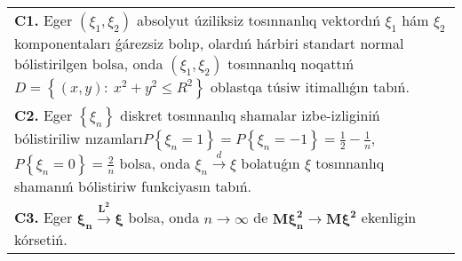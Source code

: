 \documentclass{article}
\begin{document}
\begin{tabular}{m{17cm}}
\textbf{C1.} Eger \(\left( \xi_{1},\xi_{2} \right)\) absolyut úziliksiz tosınnanlıq vektordıń \(\xi_{1}\) hám \(\xi_{2}\) komponentaları ǵárezsiz bolıp, olardıń hárbiri standart normal bólistirilgen bolsa, onda \(\left( \xi_{1},\xi_{2} \right)\) tosınnanlıq noqattıń \(D = \left\{ (x,y):\ x^{2} + y^{2} \leq R^{2} \right\}\) oblastqa túsiw itimallıǵın tabıń.
 \\
\textbf{C2.} Eger \(\left\{ \xi_{n} \right\}\) diskret tosınnanlıq shamalar izbe-izliginiń bólistiriliw nızamları\(P\left\{ \xi_{n} = 1 \right\} = P\left\{ \xi_{n} = - 1 \right\} = \frac{1}{2} - \frac{1}{n},\) \(P\left\{ \xi_{n} = 0 \right\} = \frac{2}{n}\) bolsa, onda \(\xi_{n}\overset{d}{\rightarrow}\xi\) bolatuǵın \(\xi\) tosınnanlıq shamanıń bólistiriw funkciyasın tabıń.
 \\
\textbf{C3.} Eger \(\mathbf{\xi}_{\mathbf{n}}\overset{\mathbf{L}^{\mathbf{2}}}{\rightarrow}\mathbf{\xi}\) bolsa, onda \(n \rightarrow \infty\) de \(\mathbf{M}\mathbf{\xi}_{\mathbf{n}}^{\mathbf{2}}\mathbf{\rightarrow M}\mathbf{\xi}^{\mathbf{2}}\) ekenligin kórsetiń.
 \\

\end{tabular}
\vspace{1cm}
\end{document}
